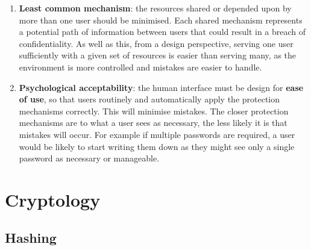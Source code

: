 \documentclass[final]{article}
\begin{document}
\begin{enumerate}
	\item \textbf{Least common mechanism}: the resources shared or depended upon by more than one user should be minimised. Each shared mechanism represents a potential path of information between users that could result in a breach of confidentiality. As well as this, from a design perspective, serving one user sufficiently with a given set of resources is easier than serving many, as the environment is more controlled and mistakes are easier to handle.
	\item \textbf{Psychological acceptability}: the human interface must be design for \textbf{ease of use}, so that users routinely and automatically apply the protection mechanisms correctly. This will minimise mistakes. The closer protection mechanisms are to what a user sees as necessary, the less likely it is that mistakes will occur. For example if multiple passwords are required, a user would be likely to start writing them down as they might see only a single password as necessary or manageable.
\end{enumerate}

\section{Cryptology}

\subsection{Hashing}
\end{document}
